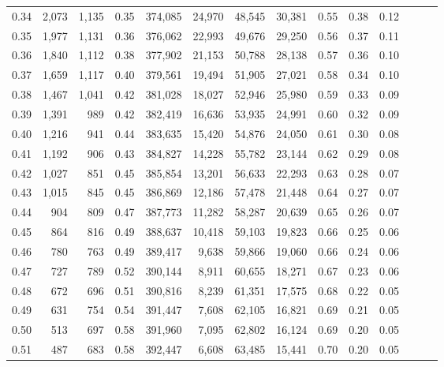 \begin{tabular}{rrrrrrrrrrrrrr}
0.34 &   2,073 &  1,135 &  0.35 &  374,085 &   24,970 &  48,545 &  30,381 &  0.55 &  0.38 &      0.12 \\
0.35 &   1,977 &  1,131 &  0.36 &  376,062 &   22,993 &  49,676 &  29,250 &  0.56 &  0.37 &      0.11 \\
0.36 &   1,840 &  1,112 &  0.38 &  377,902 &   21,153 &  50,788 &  28,138 &  0.57 &  0.36 &      0.10 \\
0.37 &   1,659 &  1,117 &  0.40 &  379,561 &   19,494 &  51,905 &  27,021 &  0.58 &  0.34 &      0.10 \\
0.38 &   1,467 &  1,041 &  0.42 &  381,028 &   18,027 &  52,946 &  25,980 &  0.59 &  0.33 &      0.09 \\
0.39 &   1,391 &    989 &  0.42 &  382,419 &   16,636 &  53,935 &  24,991 &  0.60 &  0.32 &      0.09 \\
0.40 &   1,216 &    941 &  0.44 &  383,635 &   15,420 &  54,876 &  24,050 &  0.61 &  0.30 &      0.08 \\
0.41 &   1,192 &    906 &  0.43 &  384,827 &   14,228 &  55,782 &  23,144 &  0.62 &  0.29 &      0.08 \\
0.42 &   1,027 &    851 &  0.45 &  385,854 &   13,201 &  56,633 &  22,293 &  0.63 &  0.28 &      0.07 \\
0.43 &   1,015 &    845 &  0.45 &  386,869 &   12,186 &  57,478 &  21,448 &  0.64 &  0.27 &      0.07 \\
0.44 &     904 &    809 &  0.47 &  387,773 &   11,282 &  58,287 &  20,639 &  0.65 &  0.26 &      0.07 \\
0.45 &     864 &    816 &  0.49 &  388,637 &   10,418 &  59,103 &  19,823 &  0.66 &  0.25 &      0.06 \\
0.46 &     780 &    763 &  0.49 &  389,417 &    9,638 &  59,866 &  19,060 &  0.66 &  0.24 &      0.06 \\
0.47 &     727 &    789 &  0.52 &  390,144 &    8,911 &  60,655 &  18,271 &  0.67 &  0.23 &      0.06 \\
0.48 &     672 &    696 &  0.51 &  390,816 &    8,239 &  61,351 &  17,575 &  0.68 &  0.22 &      0.05 \\
0.49 &     631 &    754 &  0.54 &  391,447 &    7,608 &  62,105 &  16,821 &  0.69 &  0.21 &      0.05 \\
0.50 &     513 &    697 &  0.58 &  391,960 &    7,095 &  62,802 &  16,124 &  0.69 &  0.20 &      0.05 \\
0.51 &     487 &    683 &  0.58 &  392,447 &    6,608 &  63,485 &  15,441 &  0.70 &  0.20 &      0.05 \\

\end{tabular}
